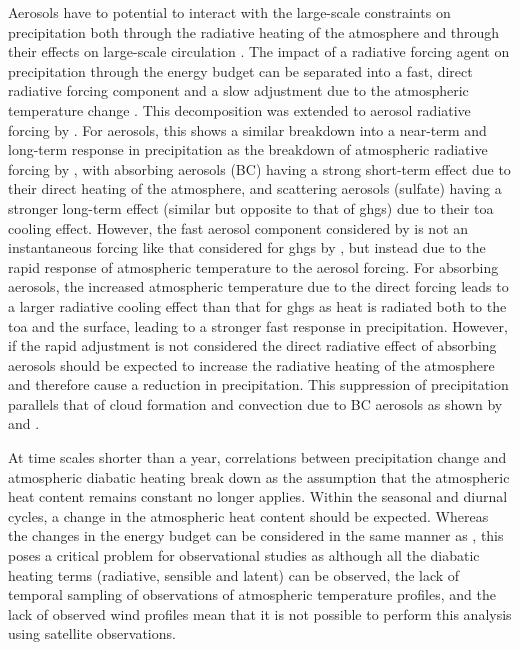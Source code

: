 Aerosols have to potential to interact with the large-scale constraints on precipitation both through the radiative heating of the atmosphere \citep{suzuki_perturbations_2019} and through their effects on large-scale circulation \citep{bollasina_anthropogenic_2011, nober_sensitivity_2003}. 
The impact of a radiative forcing agent on precipitation through the energy budget can be separated into a fast, direct radiative forcing component and a slow adjustment due to the atmospheric temperature change \citep{allen_constraints_2002}. 
This decomposition was extended to aerosol radiative forcing by \citet{richardson_drivers_2018}. 
For aerosols, this shows a similar breakdown into a near-term and long-term response in precipitation as the breakdown of atmospheric radiative forcing by \citet{suzuki_perturbations_2019}, with absorbing aerosols (BC) having a strong short-term effect due to their direct heating of the atmosphere, and scattering aerosols (sulfate) having a stronger long-term effect (similar but opposite to that of \acrshort{ghg}s) due to their \acrshort{toa}  cooling effect.
However, the fast aerosol component considered by \citet{richardson_drivers_2018} is not an instantaneous forcing like that considered for \acrshort{ghg}s by \citet{allen_constraints_2002}, but instead due to the rapid response of atmospheric temperature to the aerosol forcing.
For absorbing aerosols, the increased atmospheric temperature due to the direct forcing leads to a larger radiative cooling effect than that for \acrshort{ghg}s as heat is radiated both to the \acrshort{toa}  and the surface, leading to a stronger fast response in precipitation. 
However, if the rapid adjustment is not considered the direct radiative effect of absorbing aerosols should be expected to increase the radiative heating of the atmosphere and therefore cause a reduction in precipitation.
This suppression of precipitation parallels that of cloud formation and convection due to BC aerosols as shown by \citet{koren_smoke_2008} and \citet{fan_effects_2008}.

At time scales shorter than a year, correlations between precipitation change and atmospheric diabatic heating break down \citep{nogueira_multi-scale_2019} as the assumption that the atmospheric heat content remains constant no longer applies.
Within the seasonal and diurnal cycles, a change in the atmospheric heat content should be expected.
Whereas the changes in the energy budget can be considered in the same manner as \citet{muller_energetic_2011}, this poses a critical problem for observational studies as although all the diabatic heating terms (radiative, sensible and latent) can be observed, the lack of temporal sampling of observations of atmospheric temperature profiles, and the lack of observed wind profiles mean that it is not possible to perform this analysis using satellite observations.


